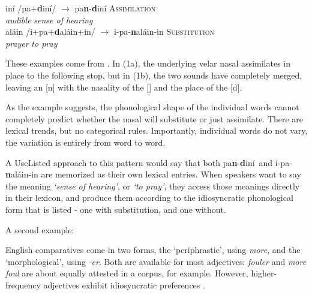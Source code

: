 \documentclass[12]{article}
\begin{document}
		
		\begin{exe}
			\ex
				\begin{xlist}
					\ex {}in\'i\textscriptg  \hspace{3ex} /pa{\bf {}}+{\bf d}in\'i\textscriptg/ \hspace{8ex} $\rightarrow$ pa{\bf n}-{\bf d}in\'i\textscriptg   \hspace{7ex} \textsc{Assimilation}\\
					{\it audible} {} {} {} {\it sense of hearing}\\
					\ex {}al\'ain \hspace{0.1ex} /i+pa{\bf \textipa{N}}+{\bf d}al\'ain+in/  $\rightarrow$ \textglotstop i-pa-{\bf n}al\'ain-in \hspace{0.5ex} \textsc{Substitution}\\
					{\it prayer} {} {} {} {\it to pray}\\
				\end{xlist}
			
		\end{exe}
	
		These examples come from \citet{zuraw10}.  In (1a), the underlying velar nasal assimilates in place to the following stop, but in (1b), the two sounds have completely merged, leaving an [n] with the nasality of the [] and the place of the [d].
		
		As the example suggests, the phonological shape of the individual words cannot completely predict whether the nasal will substitute or just assimilate.  There are lexical trends, but no categorical rules.  Importantly, individual words do not vary, the variation is entirely from word to word.
		
		A UseListed approach to this pattern would say that both pa{\bf n}-{\bf d}in\'i\textscriptg\ and \textglotstop i-pa-{\bf n}al\'ain-in are memorized as their own lexical entries.  When speakers want to say the meaning {\it `sense of hearing'}, or {\it `to pray'}, they access those meanings directly in their lexicon, and produce them according to the idiosyncratic phonological form that is listed - one with substitution, and one without.
		
		\hspace{2ex}
		
		A second example: 
		
		English comparatives come in two forms, the `periphrastic', using {\it more}, and the `morphological', using {\it -er}.  Both are available for most adjectives: {\it fouler} and {\it more foul} are about equally attested in a corpus, for example.  However, higher-frequency adjectives exhibit idiosyncratic preferences \citet{smithmoorecantwell17}.
		
\end{document}
